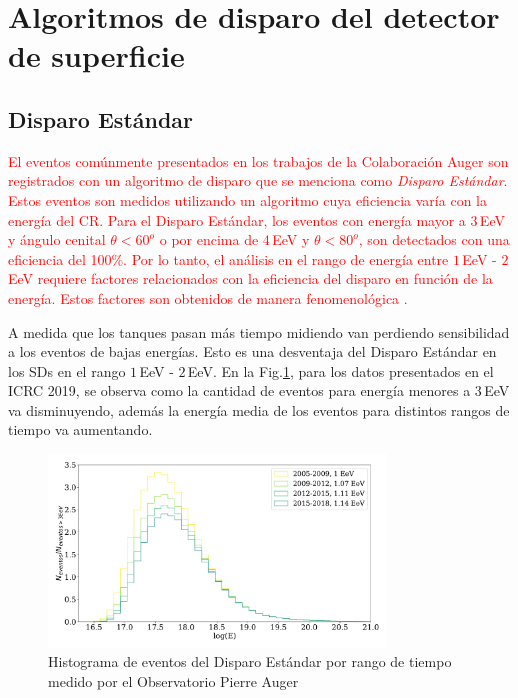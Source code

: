 \section{Algoritmos de disparo del detector de superficie} \label{triggers_caracteristicas}

\subsection{Disparo Estándar}

\textcolor{red}{El eventos comúnmente presentados en los trabajos de la Colaboración Auger son registrados con un algoritmo de disparo que se menciona como \emph{Disparo Estándar}.  Estos eventos son medidos utilizando un algoritmo cuya eficiencia varía con la energía del CR. Para el Disparo Estándar, los eventos con energía mayor a $3\,$EeV y ángulo cenital $\theta<60^o$ o  por encima de $4\,$EeV y $\theta<80^o$, son detectados con una eficiencia del 100\%. Por lo tanto, el análisis en el rango de energía entre $1\,$EeV - $2\,$EeV requiere factores relacionados con la eficiencia del disparo en función de la energía. Estos factores son obtenidos de manera fenomenológica \cite{taborda}.}


A medida que los tanques pasan más tiempo midiendo van perdiendo sensibilidad a los eventos de bajas energías. Esto es una desventaja del Disparo Estándar en los SDs en el rango $1\,$EeV - $2\,$EeV.  En la Fig.\ref{fig:futuro}, para los datos presentados en el ICRC 2019, se observa como la cantidad de eventos para energía menores a $3\,$EeV va disminuyendo, además la energía media de los eventos para distintos rangos de tiempo va aumentando.

\begin{figure}[H]
	\centering
	\includegraphics[width=0.8\textwidth]{histograma_Standard.pdf}
	\caption{Histograma de eventos  del Disparo Estándar por rango de tiempo medido por el Observatorio Pierre Auger}
	\label{fig:futuro}
\end{figure}


